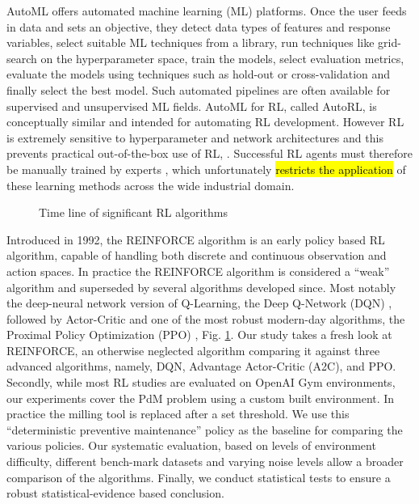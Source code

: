 \documentclass[referee, sn-mathphys-num]{sn-jnl}
\newcommand{\hlc}[2][cyan!15]{{\colorlet{foo}{#1}\sethlcolor{foo}\hl{#2}}}
\begin{document}
	AutoML offers automated machine learning (ML) platforms. Once the user feeds in data and sets an objective, they detect data types of features and response variables, select suitable ML techniques from a library, run techniques like grid-search on the hyperparameter space, train the models, select evaluation metrics, evaluate the models using techniques such as hold-out or cross-validation and finally select the best model. Such automated pipelines are often available for supervised and unsupervised ML fields. AutoML for RL, called AutoRL, is conceptually similar and intended for automating RL development. However RL is extremely sensitive to hyperparameter and network architectures and this prevents practical out-of-the-box use of RL, \cite{autorl:shala2022, autorl:afshar2022}. Successful RL agents must therefore be manually trained by experts \cite{autorl:parker2022}, which unfortunately \hlc{restricts the application} of these learning methods across the wide industrial domain.
	
	\begin{figure}[hbt!]	
		\startchronology[startyear=1940, startdate=false, stopdate=false, arrow=false, color=codegray, height=.5ex]
		\stopchronology
		\vspace{-36pt}
		\caption{Time line of significant RL algorithms}
		\label{fig_TimeLine}
	\end{figure}
	Introduced in 1992, the REINFORCE algorithm \cite{REINFORCE-williams1992} is an early policy based RL algorithm, capable of handling both discrete and continuous observation and action spaces. In practice the REINFORCE algorithm is considered a ``weak'' algorithm and superseded by several algorithms developed since. Most notably the deep-neural network version of Q-Learning, the Deep Q-Network (DQN) \cite{DQN-mnih2013}, followed by Actor-Critic \cite{A2C-mnih2016} and one of the most robust modern-day algorithms, the Proximal Policy Optimization (PPO) \cite{PPO-schulman2017}, Fig. \ref{fig_TimeLine}. Our study takes a fresh look at REINFORCE, an otherwise neglected algorithm comparing it against three advanced algorithms, namely, DQN, Advantage Actor-Critic (A2C), and PPO. Secondly, while most RL studies are evaluated on OpenAI Gym environments, our experiments cover the PdM problem using a custom built environment. In practice the milling tool is replaced after a set threshold. We use this ``deterministic preventive maintenance'' policy as the baseline for comparing the various policies. Our systematic evaluation, based on levels of environment difficulty, different bench-mark datasets and varying noise levels allow a broader comparison of the algorithms. Finally, we conduct statistical tests to ensure a robust statistical-evidence based conclusion.\\
	
\end{document}
